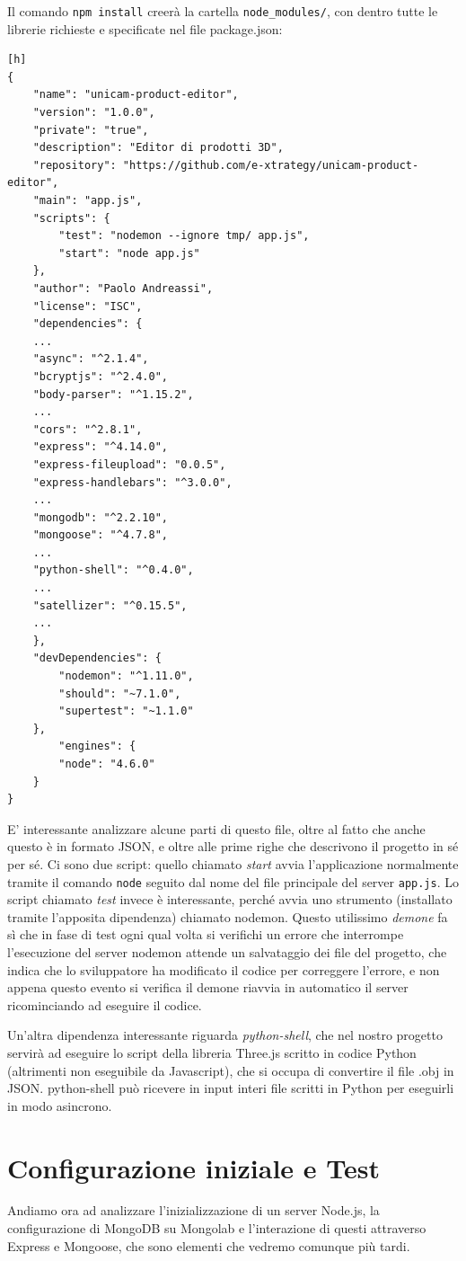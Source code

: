 Il comando \texttt{npm install} creerà la cartella \texttt{node\_modules/}, con dentro tutte le librerie richieste e specificate nel file package.json:
\begin{lstlisting}[caption={package.json}, style=javaScriptCode][h]
{
	"name": "unicam-product-editor",
	"version": "1.0.0",
	"private": "true",
	"description": "Editor di prodotti 3D",
	"repository": "https://github.com/e-xtrategy/unicam-product-editor",
	"main": "app.js",
	"scripts": {
		"test": "nodemon --ignore tmp/ app.js",
		"start": "node app.js"
	},
	"author": "Paolo Andreassi",
	"license": "ISC",
	"dependencies": {
	...
	"async": "^2.1.4",
	"bcryptjs": "^2.4.0",
	"body-parser": "^1.15.2",
	...
	"cors": "^2.8.1",
	"express": "^4.14.0",
	"express-fileupload": "0.0.5",
	"express-handlebars": "^3.0.0",
	...
	"mongodb": "^2.2.10",
	"mongoose": "^4.7.8",
	...
	"python-shell": "^0.4.0",
	...
	"satellizer": "^0.15.5",
	...
	},
	"devDependencies": {
		"nodemon": "^1.11.0",
		"should": "~7.1.0",
		"supertest": "~1.1.0"
	},
		"engines": {
		"node": "4.6.0"
	}
}
\end{lstlisting}

E' interessante analizzare alcune parti di questo file, oltre al fatto che anche questo è in formato JSON, e oltre alle prime righe che descrivono il progetto in sé per sé.
Ci sono due script: quello chiamato \emph{start} avvia l'applicazione normalmente tramite il comando \texttt{node} seguito dal nome del file principale del server \texttt{app.js}.
Lo script chiamato \emph{test} invece è interessante, perché avvia uno strumento (installato tramite l'apposita dipendenza) chiamato nodemon. Questo utilissimo \emph{demone} fa sì che in fase di test ogni qual volta si verifichi un errore che interrompe l'esecuzione del server nodemon attende un salvataggio dei file del progetto, che indica che lo sviluppatore ha modificato il codice per correggere l'errore, e non appena questo evento si verifica il demone riavvia in automatico il server ricominciando ad eseguire il codice.

Un'altra dipendenza interessante riguarda \emph{python-shell}, che nel nostro progetto servirà ad eseguire lo script della libreria Three.js scritto in codice Python (altrimenti non eseguibile da Javascript), che si occupa di convertire il file .obj in JSON. python-shell può ricevere in input interi file scritti in Python per eseguirli in modo asincrono.

\section{Configurazione iniziale e Test}
Andiamo ora ad analizzare l'inizializzazione di un server Node.js, la configurazione di MongoDB su Mongolab e l'interazione di questi attraverso Express e Mongoose, che sono elementi che vedremo comunque più tardi.

